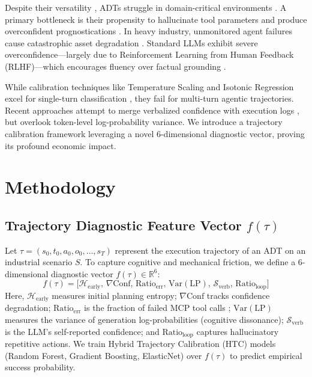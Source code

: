 \documentclass[10pt,twocolumn,a4paper]{article}
\begin{document}
Despite their versatility \cite{boiko2023emergent}, ADTs struggle in domain-critical environments \cite{das2025phmforge}. A primary bottleneck is their propensity to hallucinate tool parameters and produce overconfident prognostications \cite{huang2023survey}. In heavy industry, unmonitored agent failures cause catastrophic asset degradation \cite{zhao2023large}. Standard LLMs exhibit severe overconfidence—largely due to Reinforcement Learning from Human Feedback (RLHF)—which encourages fluency over factual grounding \cite{ouyang2022training, kuleshov2018accurate}.

While calibration techniques like Temperature Scaling and Isotonic Regression excel for single-turn classification \cite{guo2017calibration}, they fail for multi-turn agentic trajectories. Recent approaches attempt to merge verbalized confidence with execution logs \cite{gupta2025calvert}, but overlook token-level log-probability variance. We introduce a trajectory calibration framework leveraging a novel 6-dimensional diagnostic vector, proving its profound economic impact.

\section{Methodology}
\subsection{Trajectory Diagnostic Feature Vector $f(\tau)$}
Let $\tau = (s_0, t_0, a_0, o_0, \dots, s_T)$ represent the execution trajectory of an ADT on an industrial scenario $S$. To capture cognitive and mechanical friction, we define a 6-dimensional diagnostic vector $f(\tau) \in \mathbb{R}^6$:
\begin{equation}
f(\tau) = \big[ \mathcal{H}_{\text{early}}, \, \nabla\text{Conf}, \, \text{Ratio}_{\text{err}}, \, \text{Var}(\text{LP}), \, \mathcal{S}_{\text{verb}}, \, \text{Ratio}_{\text{loop}} \big]
\end{equation}
Here, \textbf{$\mathcal{H}_{\text{early}}$} measures initial planning entropy; \textbf{$\nabla\text{Conf}$} tracks confidence degradation; \textbf{$\text{Ratio}_{\text{err}}$} is the fraction of failed MCP tool calls \cite{mialon2023augmented}; \textbf{$\text{Var}(\text{LP})$} measures the variance of generation log-probabilities (cognitive dissonance); \textbf{$\mathcal{S}_{\text{verb}}$} is the LLM's self-reported confidence; and \textbf{$\text{Ratio}_{\text{loop}}$} captures hallucinatory repetitive actions. We train Hybrid Trajectory Calibration (HTC) models (Random Forest, Gradient Boosting, ElasticNet) over $f(\tau)$ to predict empirical success probability.
\end{document}
